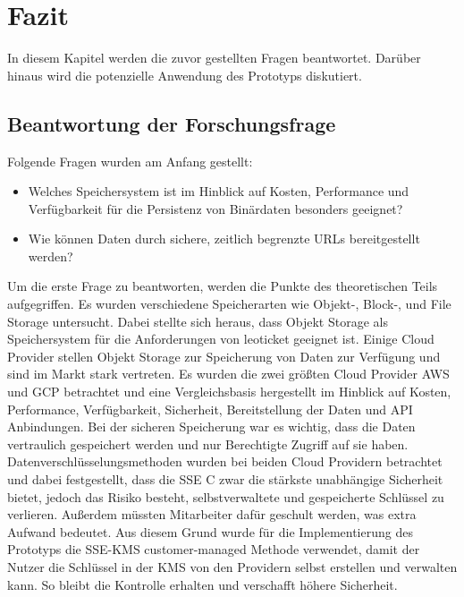 \chapter{Fazit}

In diesem Kapitel werden die zuvor gestellten Fragen beantwortet. Darüber hinaus wird die potenzielle Anwendung des Prototyps diskutiert.

\section{Beantwortung der Forschungsfrage}

Folgende Fragen wurden am Anfang gestellt:

\begin{itemize}
	\item Welches Speichersystem ist im Hinblick auf Kosten, Performance und Verfügbarkeit für die Persistenz von Binärdaten besonders geeignet? 
	\item Wie können Daten durch sichere, zeitlich begrenzte URLs bereitgestellt werden?
\end{itemize}

Um die erste Frage zu beantworten, werden die Punkte des theoretischen Teils aufgegriffen. Es wurden verschiedene Speicherarten wie Objekt-, Block-, und File Storage untersucht. Dabei stellte sich heraus, dass Objekt Storage als Speichersystem für die Anforderungen von leoticket geeignet ist. Einige Cloud Provider stellen Objekt Storage zur Speicherung von Daten zur Verfügung und sind im Markt stark vertreten. Es wurden die zwei größten Cloud Provider AWS und GCP betrachtet und eine Vergleichsbasis hergestellt im Hinblick auf Kosten, Performance, Verfügbarkeit, Sicherheit, Bereitstellung der Daten und API Anbindungen. Bei der sicheren Speicherung war es wichtig, dass die Daten vertraulich gespeichert werden und nur Berechtigte Zugriff auf sie haben.\\

 Datenverschlüsselungsmethoden wurden bei beiden Cloud Providern betrachtet und dabei festgestellt, dass die SSE C zwar die stärkste unabhängige Sicherheit bietet, jedoch das Risiko besteht, selbstverwaltete und gespeicherte Schlüssel zu verlieren. Außerdem müssten Mitarbeiter dafür geschult werden, was extra Aufwand bedeutet. Aus diesem Grund wurde für die Implementierung des Prototyps die SSE-KMS customer-managed Methode verwendet, damit der Nutzer die Schlüssel in der KMS von den Providern selbst erstellen und verwalten kann. So bleibt die Kontrolle erhalten und verschafft höhere Sicherheit.\\ 
 
